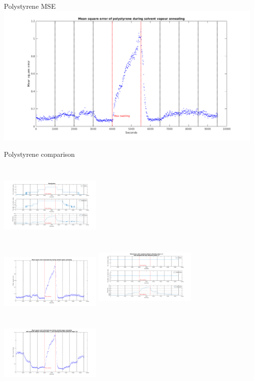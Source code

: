 \documentclass[10pt]{beamer}
\begin{document}
\begin{frame}{Polystyrene MSE}
\includegraphics[width=\textwidth]{PSswelling2.png}
\end{frame}


\begin{frame}{Polystyrene comparison}
\begin{columns}[t]
	\centering
	\includegraphics[width=5cm,height=3.5cm]{PSswelling1.png}\\
	\includegraphics[width=5cm,height=3.5cm]{PSswelling2.png}
	\centering
	\includegraphics[width=5cm,height=4cm]{PSn12n18AVG1.png}\\
	\includegraphics[width=5cm,height=4cm]{PSn12n18AVG2.png}
\end{columns}
\end{frame}
\end{document}
